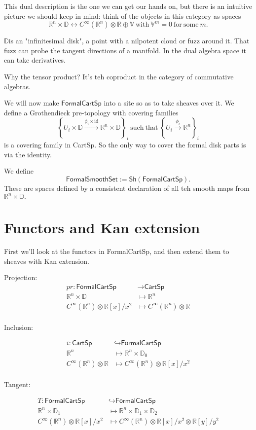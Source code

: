 \documentclass[12pt]{article}
\newcommand{\rr}{\ensuremath{\mathbb{R}}}
\newcommand{\rrn}{\ensuremath{\mathbb{R}^n}}
\newcommand{\rrx}{\ensuremath{\mathbb{R}[x]/x^2}}
\newcommand{\rry}{\ensuremath{\mathbb{R}[y]/y^2}}
\newcommand{\dd}{\ensuremath{\mathbb{D}}}
\newcommand{\cinfty}{\ensuremath{C^{\infty}}}
\newcommand{\cart}{\textsf{CartSp}}
\newcommand{\formalcart}{\textsf{FormalCartSp}}
\newcommand{\formalsmoothset}{\textsf{FormalSmoothSet}}
\newcommand{\sh}[1]{\textsf{Sh}(#1)}
\begin{document}
This dual description is the one we can get our hands on, but there is an intuitive picture we should keep in mind: think of the objects in this category as spaces $$\rr^n\times\dd\leftrightarrow\cinfty(\rr^n)\otimes\rr\oplus\mathbb{V}\mathrm{\ with\ }\mathbb{V}^m=0\mathrm{\ for\ some\ }m.$$

\dd is an "infinitesimal disk", a point with a nilpotent cloud or fuzz around it. That fuzz can probe the tangent directions of a manifold. In the dual algebra space it can take derivatives.

Why the tensor product? It's teh coproduct in the category of commutative algebras.

We will now make $\formalcart$ into a site so as to take sheaves over it. We define a Grothendieck pre-topology with covering families $$\left\{U_i\times\dd\xrightarrow[]{\phi_i\times\mathrm{id}}\rr^n\times\dd\right\}_i\mathrm{\ such\ that\ }\left\{U_i\xrightarrow[]{\phi_i}\rr^n\right\}_i$$
is a covering family in \cart. So the only way to cover the formal disk parts is via the identity.

We define $$\formalsmoothset:=\sh{\formalcart}.$$ These are spaces defined by a consistent declaration of all teh smooth maps from $\rr^n\times\dd.$

\section{Functors and Kan extension}\label{sec:functors}
First we'll look at the functors in \formalcart, and then extend them to sheaves with Kan extension.

Projection:
\begin{align*}
pr:\formalcart &\to\cart \\
\rr^n\times\dd &\mapsto \rr^n \\
\cinfty(\rrn)\otimes\rrx &\mapsto \cinfty(\rrn)\otimes\rr \\
\end{align*}

Inclusion:

\begin{align*}
i:\cart &\hookrightarrow\formalcart \\
\rrn &\mapsto \rrn\times\dd_0 \\
\cinfty(\rrn)\otimes\rr &\mapsto\cinfty(\rrn)\otimes\rrx \\
\end{align*}

Tangent:

\begin{align*}
T:\formalcart &\hookrightarrow\formalcart \\
\rrn\times\dd_1 &\mapsto \rrn\times\dd_1\times\dd_2 \\
\cinfty(\rrn)\otimes\rrx &\mapsto\cinfty(\rrn)\otimes\rrx\otimes\rry \\
\end{align*}
\end{document}
